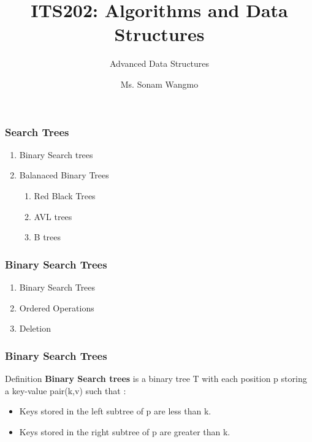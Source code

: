 \documentclass[11pt]{beamer}
\begin{document}
	\author{Ms. Sonam Wangmo}
	\title{ITS202: Algorithms and Data Structures}
	\subtitle{Advanced Data Structures}
	\institute{
		\textcolor{blue}{Gyalpozhing College of Information Technology \\ Royal University of Bhutan} \\
		\vspace{0.5cm}
	}
	\begin{frame}[plain]
		\maketitle
	\end{frame}
	\begin{frame}
		\frametitle{Search Trees}
		\begin{enumerate}
			\item Binary Search trees
			\item Balanaced Binary Trees
			\begin{enumerate}
				\item Red Black Trees
				\item AVL trees
				\item B trees
			\end{enumerate}
		\end{enumerate}
	\end{frame}
    \begin{frame}
    	\frametitle{Binary Search Trees}
    		\begin{enumerate}
    		\item Binary Search Trees
    		\item Ordered Operations
    	    \item Deletion
    		\end{enumerate}
    \end{frame}
   
    \begin{frame}
   	\frametitle{Binary Search Trees}
   	\begin{block}{Definition}
   		\textbf{Binary Search trees} is a binary tree T with each position p storing a key-value pair(k,v) such that :
   		\begin{itemize}
   			\item Keys stored in the left subtree of p are less than k.
   			\item Keys stored in the right subtree of p are greater than k.
   		\end{itemize}
   	\end{block}
   \end{frame}
\end{document}
